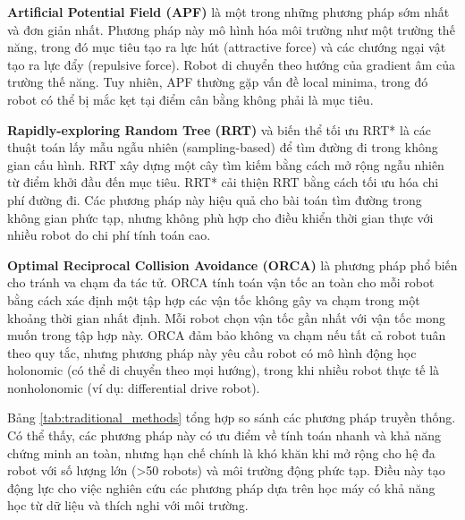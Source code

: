 \textbf{Artificial Potential Field (APF)} \cite{khatib1986real} là một trong những phương pháp sớm nhất và đơn giản nhất. Phương pháp này mô hình hóa môi trường như một trường thế năng, trong đó mục tiêu tạo ra lực hút (attractive force) và các chướng ngại vật tạo ra lực đẩy (repulsive force). Robot di chuyển theo hướng của gradient âm của trường thế năng. Tuy nhiên, APF thường gặp vấn đề local minima, trong đó robot có thể bị mắc kẹt tại điểm cân bằng không phải là mục tiêu.

\textbf{Rapidly-exploring Random Tree (RRT)} \cite{lavalle1998rrt} và biến thể tối ưu RRT* \cite{karaman2011rrtstar} là các thuật toán lấy mẫu ngẫu nhiên (sampling-based) để tìm đường đi trong không gian cấu hình. RRT xây dựng một cây tìm kiếm bằng cách mở rộng ngẫu nhiên từ điểm khởi đầu đến mục tiêu. RRT* cải thiện RRT bằng cách tối ưu hóa chi phí đường đi. Các phương pháp này hiệu quả cho bài toán tìm đường trong không gian phức tạp, nhưng không phù hợp cho điều khiển thời gian thực với nhiều robot do chi phí tính toán cao.

\textbf{Optimal Reciprocal Collision Avoidance (ORCA)} \cite{vandenberg2011orca} là phương pháp phổ biến cho tránh va chạm đa tác tử. ORCA tính toán vận tốc an toàn cho mỗi robot bằng cách xác định một tập hợp các vận tốc không gây va chạm trong một khoảng thời gian nhất định. Mỗi robot chọn vận tốc gần nhất với vận tốc mong muốn trong tập hợp này. ORCA đảm bảo không va chạm nếu tất cả robot tuân theo quy tắc, nhưng phương pháp này yêu cầu robot có mô hình động học holonomic (có thể di chuyển theo mọi hướng), trong khi nhiều robot thực tế là nonholonomic (ví dụ: differential drive robot).

Bảng \ref{tab:traditional_methods} tổng hợp so sánh các phương pháp truyền thống. Có thể thấy, các phương pháp này có ưu điểm về tính toán nhanh và khả năng chứng minh an toàn, nhưng hạn chế chính là khó khăn khi mở rộng cho hệ đa robot với số lượng lớn (>50 robots) và môi trường động phức tạp. Điều này tạo động lực cho việc nghiên cứu các phương pháp dựa trên học máy có khả năng học từ dữ liệu và thích nghi với môi trường.

